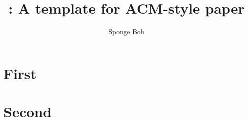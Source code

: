 \documentclass[sigplan,natbib=true,10pt,balance]{acmart}
\title{\systitle: A template for ACM-style paper}
\author{Sponge Bob}
\affiliation{\institution{University of Bikini Bottom} \city{Bikini Bottom} \country{Sea}}
\begin{document}
\maketitle

\section{First}
\lipsum[3-6]

\section{Second}
\lipsum[7-10]

\nocite{*}



\end{document}
